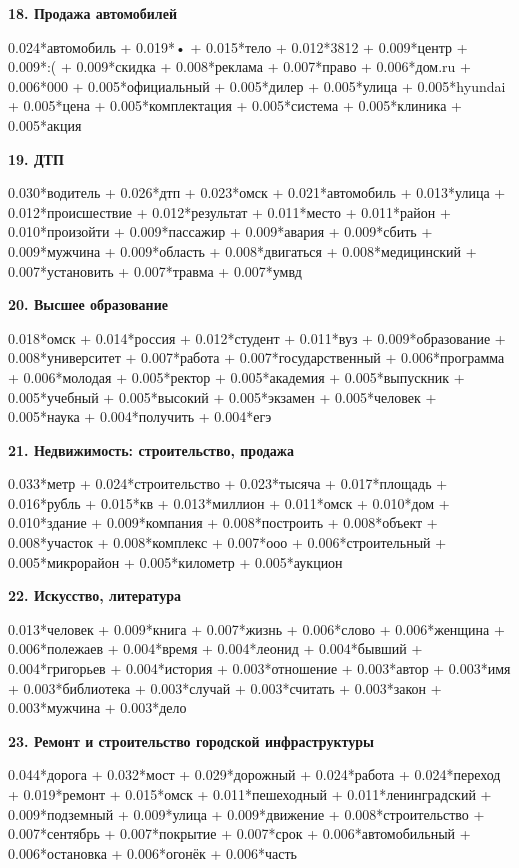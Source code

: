 \textbf{18. Продажа автомобилей}

0.024*автомобиль + 0.019*• + 0.015*тело + 0.012*3812 + 0.009*центр + 0.009*:( + 0.009*скидка + 0.008*реклама + 0.007*право + 0.006*дом.ru + 0.006*000 + 0.005*официальный + 0.005*дилер + 0.005*улица + 0.005*hyundai + 0.005*цена + 0.005*комплектация + 0.005*система + 0.005*клиника + 0.005*акция

\textbf{19. ДТП}

0.030*водитель + 0.026*дтп + 0.023*омск + 0.021*автомобиль + 0.013*улица + 0.012*происшествие + 0.012*результат + 0.011*место + 0.011*район + 0.010*произойти + 0.009*пассажир + 0.009*авария + 0.009*сбить + 0.009*мужчина + 0.009*область + 0.008*двигаться + 0.008*медицинский + 0.007*установить + 0.007*травма + 0.007*умвд

\textbf{20. Высшее образование}

0.018*омск + 0.014*россия + 0.012*студент + 0.011*вуз + 0.009*образование + 0.008*университет + 0.007*работа + 0.007*государственный + 0.006*программа + 0.006*молодая + 0.005*ректор + 0.005*академия + 0.005*выпускник + 0.005*учебный + 0.005*высокий + 0.005*экзамен + 0.005*человек + 0.005*наука + 0.004*получить + 0.004*егэ

\textbf{21. Недвижимость: строительство, продажа}

0.033*метр + 0.024*строительство + 0.023*тысяча + 0.017*площадь + 0.016*рубль + 0.015*кв + 0.013*миллион + 0.011*омск + 0.010*дом + 0.010*здание + 0.009*компания + 0.008*построить + 0.008*объект + 0.008*участок + 0.008*комплекс + 0.007*ооо + 0.006*строительный + 0.005*микрорайон + 0.005*километр + 0.005*аукцион

\textbf{22. Искусство, литература}

0.013*человек + 0.009*книга + 0.007*жизнь + 0.006*слово + 0.006*женщина + 0.006*полежаев + 0.004*время + 0.004*леонид + 0.004*бывший + 0.004*григорьев + 0.004*история + 0.003*отношение + 0.003*автор + 0.003*имя + 0.003*библиотека + 0.003*случай + 0.003*считать + 0.003*закон + 0.003*мужчина + 0.003*дело

\textbf{23. Ремонт и строительство городской инфраструктуры}

0.044*дорога + 0.032*мост + 0.029*дорожный + 0.024*работа + 0.024*переход + 0.019*ремонт + 0.015*омск + 0.011*пешеходный + 0.011*ленинградский + 0.009*подземный + 0.009*улица + 0.009*движение + 0.008*строительство + 0.007*сентябрь + 0.007*покрытие + 0.007*срок + 0.006*автомобильный + 0.006*остановка + 0.006*огонёк + 0.006*часть


